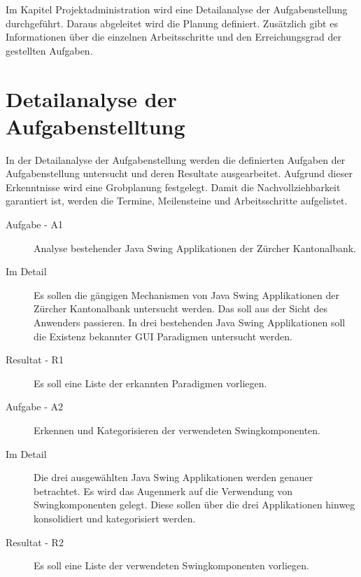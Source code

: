   Im Kapitel Projektadministration wird eine Detailanalyse der Aufgabenstellung
  durchgeführt. Daraus abgeleitet wird die Planung definiert. Zusätzlich gibt es
  Informationen über die einzelnen Arbeitsschritte und den Erreichungsgrad der
  gestellten Aufgaben.
  
  \section{Detailanalyse der Aufgabenstelltung}

  In der Detailanalyse der Aufgabenstellung werden die definierten Aufgaben der
  Aufgabenstellung untersucht und deren Resultate ausgearbeitet. Aufgrund dieser
  Erkenntnisse wird eine Grobplanung festgelegt. Damit die Nachvollziehbarkeit
  garantiert ist, werden die Termine, Meilensteine und Arbeitsschritte
  aufgelistet.
  
  \begin{description}
    \item[Aufgabe - A1\label{itm:Aufgabe-01}]
    \begin{itshape}Analyse bestehender Java Swing Applikationen der Zürcher
    Kantonalbank.\end{itshape}
    \item[Im Detail\label{itm:Detail-01}]
    Es sollen die gängigen Mechanismen von Java Swing Applikationen der Zürcher
    Kantonalbank untersucht werden. Das soll aus der Sicht des Anwenders
    passieren. In drei bestehenden Java Swing Applikationen soll die Existenz
    bekannter GUI Paradigmen untersucht werden.
    \item[Resultat - R1\label{itm:Resultat-01}]
    Es soll eine Liste der erkannten Paradigmen vorliegen.
  \end{description}
  
  \begin{description}
    \item[Aufgabe - A2\label{itm:Aufgabe-02}]
    \begin{itshape}Erkennen und Kategorisieren der verwendeten
    Swingkomponenten.\end{itshape}
    \item[Im Detail\label{itm:Detail-02}]
    Die drei ausgewählten Java Swing Applikationen werden genauer betrachtet.
    Es wird das Augenmerk auf die Verwendung von Swingkomponenten gelegt. Diese
    sollen über die drei Applikationen hinweg konsolidiert und kategorisiert
    werden.
    \item[Resultat - R2\label{itm:Resultat-02}]
    Es soll eine Liste der verwendeten Swingkomponenten vorliegen.
  \end{description}
  

